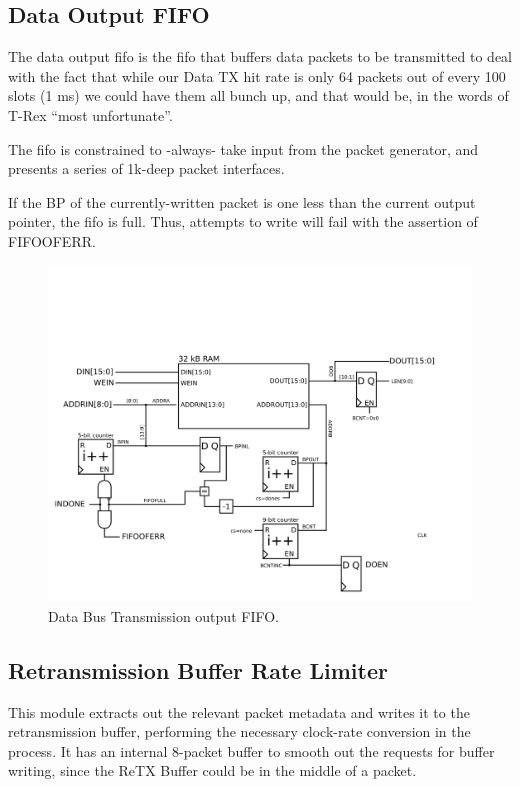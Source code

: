 \subsection{Data Output FIFO}
The data output fifo is the fifo that buffers data packets to be
transmitted to deal with the fact that while our Data TX hit rate is
only 64 packets out of every 100 slots (1 ms) we could have them all
bunch up, and that would be, in the words of T-Rex ``most
unfortunate''.

The fifo is constrained to -always- take input from the packet
generator, and presents a series of 1k-deep packet interfaces.

If the BP of the currently-written packet is one less than the current output pointer, the fifo is full. Thus, attempts to write will fail with the assertion of FIFOOFERR. 

\begin{figure}
\begin{centering}
\includegraphics[scale=0.8]{data.outputfifo.svg}
\end{centering}
\caption{Data Bus Transmission output FIFO.}
\label{data.outputfifo}
\end{figure}

\subsection{Retransmission Buffer Rate Limiter}
This module extracts out the relevant packet metadata and writes it to
the retransmission buffer, performing the necessary clock-rate
conversion in the process. It has an internal 8-packet buffer to
smooth out the requests for buffer writing, since the ReTX Buffer
could be in the middle of a packet.


